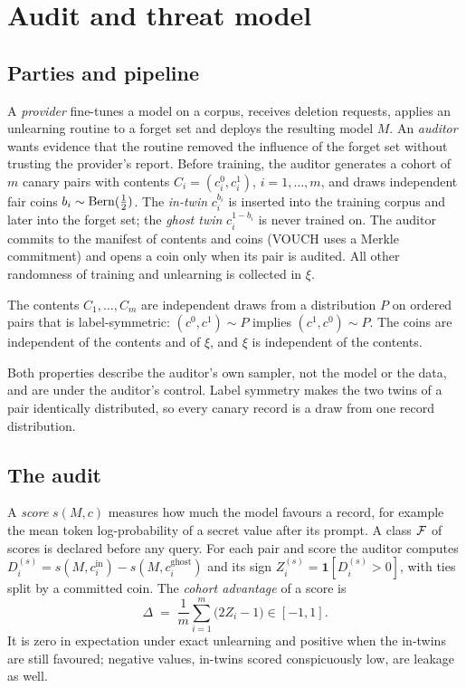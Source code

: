 \section{Audit and threat model}\label{sec:model}

\subsection{Parties and pipeline}

A \emph{provider} fine-tunes a model on a corpus, receives deletion requests, applies an
unlearning routine to a forget set and deploys the resulting model $M$. An \emph{auditor}
wants evidence that the routine removed the influence of the forget set without trusting
the provider's report. Before training, the auditor generates a cohort of $m$ canary pairs
with contents $C_i=(c_i^0,c_i^1)$, $i=1,\dots,m$, and draws independent fair coins
$b_i\sim\mathrm{Bern}(\frac12)$. The \emph{in-twin} $c_i^{b_i}$ is inserted into the training corpus
and later into the forget set; the \emph{ghost twin} $c_i^{1-b_i}$ is never trained on. The
auditor commits to the manifest of contents and coins (VOUCH uses a Merkle commitment) and
opens a coin only when its pair is audited. All other randomness of training and
unlearning is collected in $\xi$.

\begin{assumption}[Generator]\label{ass:gen}
The contents $C_1,\dots,C_m$ are independent draws from a distribution $P$ on ordered pairs
that is label-symmetric: $(c^0,c^1)\sim P$ implies $(c^1,c^0)\sim P$. The coins are
independent of the contents and of $\xi$, and $\xi$ is independent of the contents.
\end{assumption}

Both properties describe the auditor's own sampler, not the model or the data, and are
under the auditor's control. Label symmetry makes the two twins of a pair identically
distributed, so every canary record is a draw from one record distribution.

\subsection{The audit}

A \emph{score} $s(M,c)$ measures how much the model favours a record, for example the mean
token log-probability of a secret value after its prompt. A class $\mathcal{F}$ of scores is declared
before any query. For each pair and score the auditor computes
$D_i^{(s)}=s(M,c_i^{\mathrm{in}})-s(M,c_i^{\mathrm{ghost}})$ and its sign
$Z_i^{(s)}=\mathbf 1[D_i^{(s)}>0]$, with ties split by a committed coin. The \emph{cohort
advantage} of a score is
\[
\Delta \;=\; \frac1m\sum_{i=1}^m\bigl(2Z_i-1\bigr)\in[-1,1].
\]
It is zero in expectation under exact unlearning and positive when the in-twins are still
favoured; negative values, in-twins scored conspicuously low, are leakage as well.

